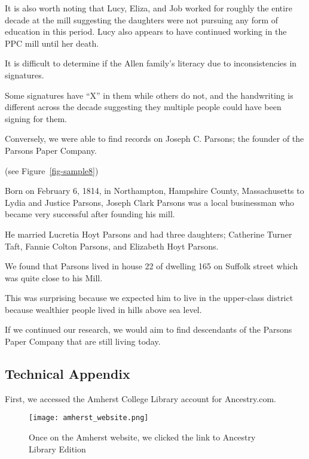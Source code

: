 \documentclass[
  letterpaper,
  DIV=11,
  numbers=noendperiod]{scrartcl}
\begin{document}
It is also worth noting that Lucy, Eliza, and Job worked for roughly the
entire decade at the mill suggesting the daughters were not pursuing any
form of education in this period. Lucy also appears to have continued
working in the PPC mill until her death.

It is difficult to determine if the Allen family's literacy due to
inconsistencies in signatures.

Some signatures have ``X'' in them while others do not, and the
handwriting is different across the decade suggesting they multiple
people could have been signing for them.

\newpage{}

Conversely, we were able to find records on Joseph C. Parsons; the
founder of the Parsons Paper Company.

(see Figure~\ref{fig-sample8})

Born on February 6, 1814, in Northampton, Hampshire County,
Massachusetts to Lydia and Justice Parsons, Joseph Clark Parsons was a
local businessman who became very successful after founding his mill.

He married Lucretia Hoyt Parsons and had three daughters; Catherine
Turner Taft, Fannie Colton Parsons, and Elizabeth Hoyt Parsons.

We found that Parsons lived in house 22 of dwelling 165 on Suffolk
street which was quite close to his Mill.

This was surprising because we expected him to live in the upper-class
district because wealthier people lived in hills above sea level.~

If we continued our research, we would aim to find descendants of the
Parsons Paper Company that are still living today.

\newpage{}

\hypertarget{technical-appendix}{%
\subsection{\texorpdfstring{\textbf{Technical
Appendix}}{Technical Appendix}}\label{technical-appendix}}

First, we accessed the Amherst College Library account for Ancestry.com.

\begin{figure}

{\centering \texttt{[image: amherst\_website.png]}

}

\caption{\label{fig-sample1}Once on the Amherst website, we clicked the
link to Ancestry Library Edition}

\end{figure}
\end{document}
